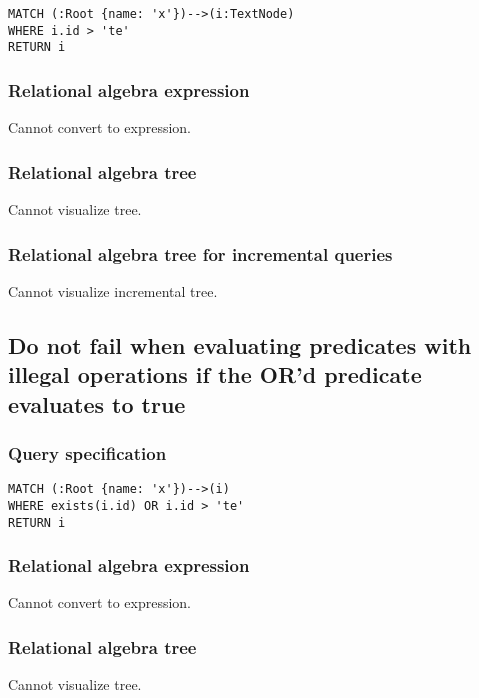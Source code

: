 \begin{lstlisting}
MATCH (:Root {name: 'x'})-->(i:TextNode)
WHERE i.id > 'te'
RETURN i
\end{lstlisting}

\subsubsection*{Relational algebra expression}

Cannot convert to expression.

\subsubsection*{Relational algebra tree}

Cannot visualize tree.

\subsubsection*{Relational algebra tree for incremental queries}

Cannot visualize incremental tree.

\subsection{Do not fail when evaluating predicates with illegal operations if the OR'd predicate evaluates to true}

\subsubsection*{Query specification}

\begin{lstlisting}
MATCH (:Root {name: 'x'})-->(i)
WHERE exists(i.id) OR i.id > 'te'
RETURN i
\end{lstlisting}

\subsubsection*{Relational algebra expression}

Cannot convert to expression.

\subsubsection*{Relational algebra tree}

Cannot visualize tree.

